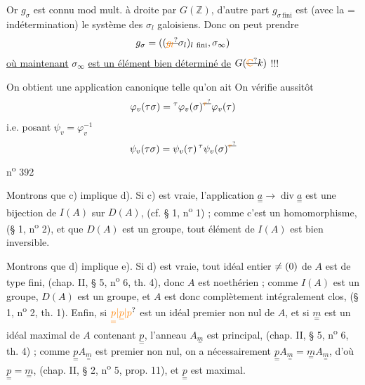 Or $g_\sigma$ est connu mod mult. à droite par $G(\mathbb Z)$, d'autre part $g_{\sigma\,\mathrm{fini}}$ est (avec la = indétermination) le système des $\sigma_l$ galoisiens. Donc on peut prendre
\[
g_\sigma=((\deleted{\unsure{g_l}}\sigma_l)_{l\ \mathrm{fini}},\sigma_\infty)
\]
\uline{où maintenant} $\sigma_\infty$ \uline{est un élément bien déterminé de} $G(\deleted{\unsure{\mathbb C}}k)$ !!!

On obtient une application canonique
 telle qu'on ait
On vérifie aussitôt
\[
\varphi_v(\tau\sigma)={}^{\tau}\varphi_v(\sigma)^{\deleted{\unsure{\tau}}}\varphi_v(\tau)
\]
i.e. posant $\psi_v=\varphi_v^{-1}$
\[
\psi_v(\tau\sigma)=\psi_v(\tau)\,{}^{\tau}\psi_v(\sigma)^{\deleted{\unsure{\tau}}}
\]
\hfill n\textsuperscript{o} 392

Montrons que c) implique d). Si c) est vraie, l'application $\underset{=}{a}\longrightarrow\operatorname{div}\underset{=}{a}$ est une bijection de $I(A)$ sur $D(A)$, (cf. § 1, n\textsuperscript{o} 1) ; comme c'est un homomorphisme, (§ 1, n\textsuperscript{o} 2), et que $D(A)$ est un groupe, tout élément de $I(A)$ est bien inversible.

Montrons que d) implique e). Si d) est vraie, tout idéal entier $\ne(0)$ de $A$ est de type fini, (chap. II, § 5, n\textsuperscript{o} 6, th. 4), donc $A$ est noethérien ; comme $I(A)$ est un groupe, $D(A)$ est un groupe, et $A$ est donc complètement intégralement clos, (§ 1, n\textsuperscript{o} 2, th. 1). Enfin, si $\unsure{\underset{=}{p}|\underline{p}|p}$ est un idéal premier non nul de $A$, et si $\underset{=}{m}$ est un idéal maximal de $A$ contenant $\underset{=}{p}$, l'anneau $A_{\underset{=}{m}}$ est principal, (chap. II, § 5, n\textsuperscript{o} 6, th. 4) ; comme $\underset{=}{p} A_{\underset{=}{m}}$ est premier non nul, on a nécessairement $\underset{=}{p} A_{\underset{=}{m}}=\underset{=}{m}A_{\underset{=}{m}}$, d'où $\underset{=}{p}=\underset{=}{m}$, (chap. II, § 2, n\textsuperscript{o} 5, prop. 11), et $\underset{=}{p}$ est maximal.

